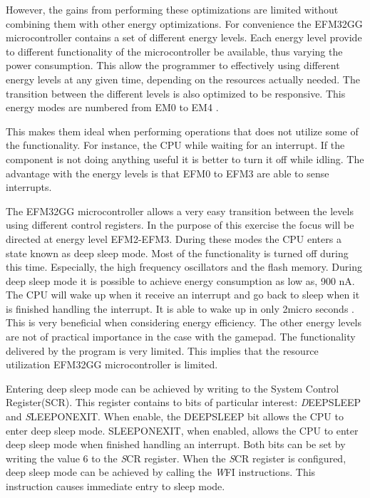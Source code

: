 However, the gains from performing these optimizations are limited without combining them with other energy optimizations.  For convenience the EFM32GG microcontroller contains a set of different energy levels. Each energy level provide to different functionality of the microcontroller be available, thus varying the power consumption. This allow the programmer to effectively using different energy levels at any given time, depending on the resources actually needed. The transition between the different levels is also optimized to be responsive.  This energy modes are numbered from EM0 to EM4 \cite{EFM32GG-energy}. 

This makes them ideal when performing operations that does not utilize some of the functionality. For instance, the CPU while waiting for an interrupt. If the component is not doing anything useful it is better to turn it off while idling. The advantage with the energy levels is that EFM0 to EFM3 are able to sense interrupts.   

The EFM32GG microcontroller allows a very easy transition between the levels using different control registers. In the purpose of this exercise the focus will be directed at energy level EFM2-EFM3. During these modes the CPU enters a state known as deep sleep mode. Most of the functionality is turned off during this time. Especially, the high frequency oscillators and the flash memory. During deep sleep mode it is possible to achieve energy consumption as low as, 900 nA. The CPU will wake up when it receive an interrupt and go back to sleep when it is finished handling the interrupt. It is able to wake up in only 2micro seconds \cite{EFM32GG-energy}. This is very beneficial when considering energy efficiency. The other energy levels are not of practical importance in the case with the gamepad. The functionality delivered by the program is very limited. This implies that the resource utilization EFM32GG microcontroller is limited. 

Entering deep sleep mode can be achieved by writing to the System Control Register(SCR). This register contains to bits of particular interest: \emph DEEPSLEEP and \emph SLEEPONEXIT. When enable, the DEEPSLEEP bit allows the CPU to enter deep sleep mode. SLEEPONEXIT, when enabled, allows the CPU to enter deep sleep mode when finished handling an interrupt. Both bits can be set by writing the value 6 to the \emph SCR register. When the \emph SCR register is configured, deep sleep mode can be achieved by calling the \emph WFI instructions. This instruction causes immediate entry to sleep mode. 

